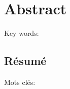 

\cleardoublepage
\chapter*{Abstract}
\lipsum[1-2]
\vskip0.5cm
Key words: 


\begin{otherlanguage}{french}
\cleardoublepage
\chapter*{Résumé}
\lipsum[1-2]
\vskip0.5cm
Mots clés: 
\end{otherlanguage}


